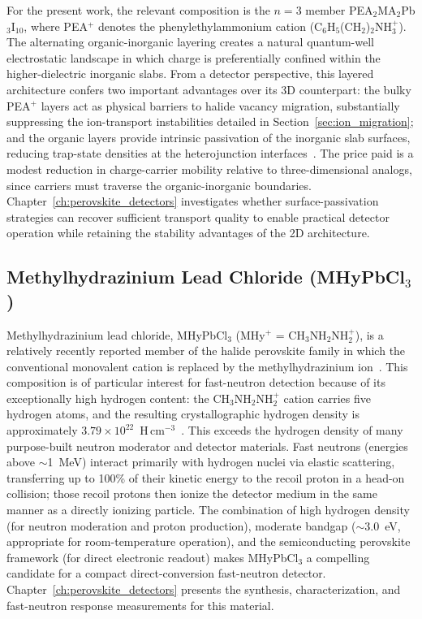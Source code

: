 For the present work, the relevant composition is the $n = 3$ member
PEA$_2$MA$_2$Pb$_3$I$_{10}$, where PEA$^+$ denotes the
phenylethylammonium cation (C$_6$H$_5$(CH$_2$)$_2$NH$_3^+$).
The alternating organic-inorganic layering creates a natural quantum-well
electrostatic landscape in which charge is preferentially confined within
the higher-dielectric inorganic slabs.  From a detector perspective, this
layered architecture confers two important advantages over its 3D
counterpart: the bulky PEA$^+$ layers act as physical barriers to halide
vacancy migration, substantially suppressing the ion-transport instabilities
detailed in Section~\ref{sec:ion_migration}; and the organic layers provide
intrinsic passivation of the inorganic slab surfaces, reducing
trap-state densities at the heterojunction interfaces~\cite{Cao2018}.
The price paid is a modest reduction in charge-carrier mobility relative
to three-dimensional analogs, since carriers must traverse the
organic-inorganic boundaries.  Chapter~\ref{ch:perovskite_detectors} investigates
whether surface-passivation strategies can recover sufficient transport
quality to enable practical detector operation while retaining the
stability advantages of the 2D architecture.

\subsection{Methylhydrazinium Lead Chloride (MHyPbCl$_3$)}

Methylhydrazinium lead chloride, MHyPbCl$_3$ (MHy$^+$ =
CH$_3$NH$_2$NH$_2^+$), is a relatively recently reported member of the
halide perovskite family in which the conventional monovalent cation is
replaced by the methylhydrazinium ion~\cite{Nowok2021}.  This composition
is of particular interest for fast-neutron detection because of its
exceptionally high hydrogen content: the CH$_3$NH$_2$NH$_2^+$ cation
carries five hydrogen atoms, and the resulting crystallographic hydrogen
density is approximately $3.79 \times 10^{22}$~H\,cm$^{-3}$~\cite{Panaccione_NIM_2024}.
This exceeds the hydrogen density of many purpose-built neutron moderator
and detector materials.  Fast neutrons (energies above $\sim$1~MeV)
interact primarily with hydrogen nuclei via elastic scattering, transferring
up to 100\% of their kinetic energy to the recoil proton in a head-on
collision; those recoil protons then ionize the detector medium in the
same manner as a directly ionizing particle.  The combination of high
hydrogen density (for neutron moderation and proton production), moderate
bandgap ($\sim$3.0~eV, appropriate for room-temperature operation), and
the semiconducting perovskite framework (for direct electronic readout)
makes MHyPbCl$_3$ a compelling candidate for a compact direct-conversion
fast-neutron detector.  Chapter~\ref{ch:perovskite_detectors} presents the synthesis,
characterization, and fast-neutron response measurements for this material.

